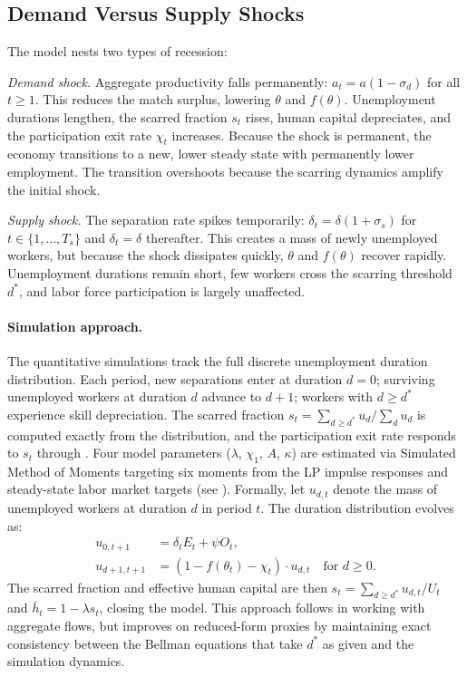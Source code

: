 \documentclass[12pt]{article}
\begin{document}
\subsection{Demand Versus Supply Shocks}

The model nests two types of recession:

\textit{Demand shock.} Aggregate productivity falls permanently: $a_t = a(1 - \sigma_d)$ for all $t \geq 1$. This reduces the match surplus, lowering $\theta$ and $f(\theta)$. Unemployment durations lengthen, the scarred fraction $s_t$ rises, human capital depreciates, and the participation exit rate $\chi_t$ increases. Because the shock is permanent, the economy transitions to a new, lower steady state with permanently lower employment. The transition overshoots because the scarring dynamics amplify the initial shock.

\textit{Supply shock.} The separation rate spikes temporarily: $\delta_t = \delta(1 + \sigma_s)$ for $t \in \{1, \ldots, T_s\}$ and $\delta_t = \delta$ thereafter. This creates a mass of newly unemployed workers, but because the shock dissipates quickly, $\theta$ and $f(\theta)$ recover rapidly. Unemployment durations remain short, few workers cross the scarring threshold $d^*$, and labor force participation is largely unaffected.

\paragraph{Simulation approach.}\label{sec:simulation_approach} The quantitative simulations track the full discrete unemployment duration distribution. Each period, new separations enter at duration $d = 0$; surviving unemployed workers at duration $d$ advance to $d + 1$; workers with $d \geq d^*$ experience skill depreciation. The scarred fraction $s_t = \sum_{d \geq d^*} u_d / \sum_d u_d$ is computed exactly from the distribution, and the participation exit rate responds to $s_t$ through . Four model parameters ($\lambda$, $\chi_1$, $A$, $\kappa$) are estimated via Simulated Method of Moments targeting six moments from the LP impulse responses and steady-state labor market targets (see ). Formally, let $u_{d,t}$ denote the mass of unemployed workers at duration $d$ in period $t$. The duration distribution evolves as:
\begin{align}
u_{0,t+1} &= \delta_t E_t + \psi O_t, \label{eq:dur_inflow} \\
u_{d+1,t+1} &= (1 - f(\theta_t) - \chi_t) \cdot u_{d,t} \quad \text{for } d \geq 0. \label{eq:dur_recursion}
\end{align}
The scarred fraction and effective human capital are then $s_t = \sum_{d \geq d^*} u_{d,t} / U_t$ and $\bar{h}_t = 1 - \lambda s_t$, closing the model. This approach follows \citet{shimer2005cyclical} in working with aggregate flows, but improves on reduced-form proxies by maintaining exact consistency between the Bellman equations that take $d^*$ as given and the simulation dynamics.
\end{document}
